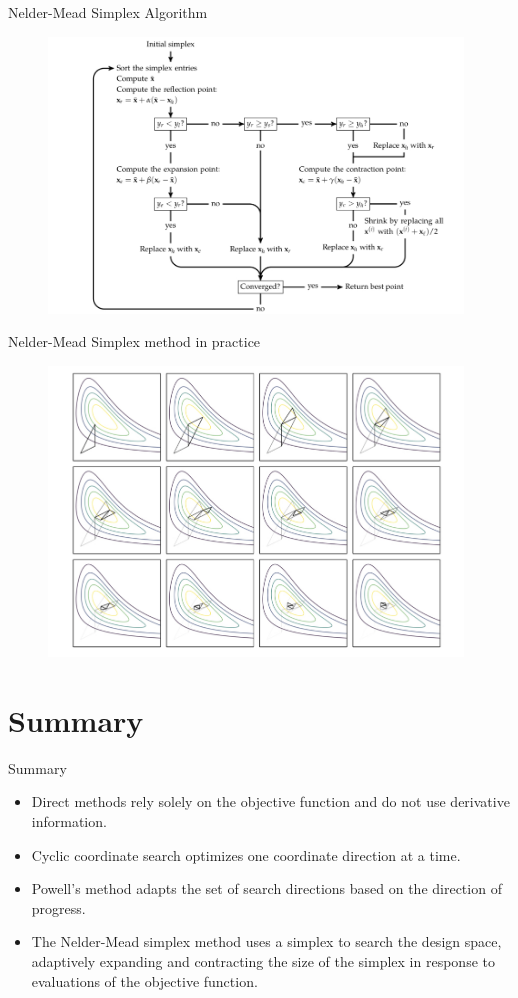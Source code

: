 \documentclass{beamer}
\begin{document}
\begin{frame}{Nelder-Mead Simplex Algorithm}

\begin{figure}
\centering
\includegraphics[width=110mm]{Figs/simplex_algo.jpeg}
\end{figure}   
\end{frame}

\begin{frame}{Nelder-Mead Simplex method in practice}

\begin{figure}
\centering
\includegraphics[width=110mm]{Figs/simplex-performance.jpeg}
\end{figure}   
\end{frame}

\section{Summary}
\begin{frame}{Summary}
    \begin{itemize}
        \item Direct methods rely solely on the objective function and do not use derivative information.
        \item Cyclic coordinate search optimizes one coordinate direction at a time.
        \item Powell’s method adapts the set of search directions based on the direction of progress.
        \item The Nelder-Mead simplex method uses a simplex to search the design space, adaptively expanding and contracting the size of the simplex in response to evaluations of the objective function.
    \end{itemize}
\end{frame}
\end{document}
